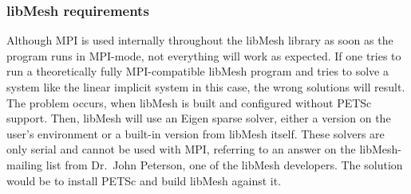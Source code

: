  
  \subsubsection{libMesh requirements}\label{sec:Impl-Parallel-Requirements}
   Although MPI is used internally throughout the libMesh library as soon as the program runs in MPI-mode, not everything will work as expected. If one tries to run a theoretically fully MPI-compatible libMesh program and tries to solve a system like the linear implicit system in this case, the wrong solutions will result. The problem occurs, when libMesh is built and configured without PETSc support. Then, libMesh will use an Eigen sparse solver, either a version on the user's environment or a built-in version from libMesh itself. These solvers are only serial and cannot be used with MPI, referring to an answer on the libMesh-mailing list from Dr.\ John Peterson, one of the libMesh developers. The solution would be to install PETSc and build libMesh against it.
  
 
 
 
